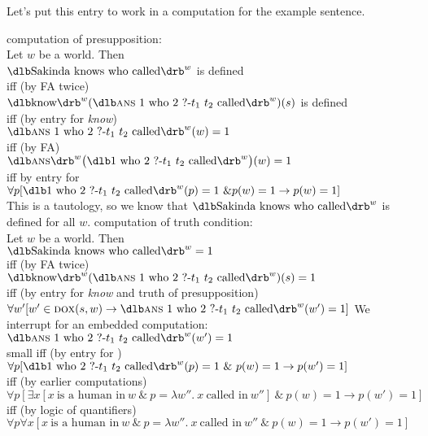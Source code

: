 Let's put this entry to work in a computation for the example sentence.

\pex\label{ex:knows-who-comp}%
\a computation of presupposition:\\
Let $w$ be a world. Then \\
$\svt{Sakinda knows who called}^{w}$ is defined\\
{\small iff (by FA twice)}\\
$\svt{know}^{w}(\svt{\ans 1 who 2 ?-$t_1$ $t_2$ called}^{w})(s)$ is defined\\
{\small iff (by entry for \emph{know})}\\
$\svt{\ans 1 who 2 ?-$t_1$ $t_2$ called}^{w}(w)=1$\\
{\small iff (by FA)}\\
$\svt{\ans}^{w}\big(\svt{1 who 2 ?-$t_1$ $t_2$ called}^{w}\bigr)(w)=1$\\
{\small iff by entry for \ans}\\
$\forall p [ \svt{1 who 2 ?-$t_1$ $t_2$ called}^{w}(p)=1\ \& p(w)=1 \rightarrow p(w)=1 ]$\\
This is a tautology, so we know that $\svt{Sakinda knows who called}^{w}$ is
defined for all $w$.
\a computation of truth condition:\\
Let $w$ be a world. Then\\
$\svt{Sakinda knows who called}^{w} = 1$\\
{\small iff (by FA twice)}\\
$\svt{know}^{w}(\svt{\ans 1 who 2 ?-$t_1$ $t_2$ called}^{w})(s) = 1$\\
{\small iff (by entry for \emph{know} and truth of presupposition)}\\
$\forall w' [w'\in \dox(s,w) \rightarrow \svt{\ans 1 who 2 ?-$t_1$ $t_2$ called}^{w}(w')=1]$
\a We interrupt for an embedded computation:\\
$\svt{\ans 1 who 2 ?-$t_1$ $t_2$ called}^{w}(w')=1$\\
{small iff (by entry for \ans)}\\
$\forall p [ \svt{1 who 2 ?-$t_1$ $t_2$ called}^{w}(p)=1\ \&\ p(w)=1 \rightarrow p(w')=1 ]$\\
{\small iff (by earlier computations)}\\
$\forall p [\exists x [x\ \text{is a human
  in}\ w\ \&\ p=\lambda w''.\ x\ \text{called
  in}\ w'']\ \&\ p(w)=1 \rightarrow p(w')=1 ]$\\
{\small iff (by logic of quantifiers)}\\
$\forall p\forall x [x\ \text{is a human
  in}\ w\ \&\ p=\lambda w''.\ x\ \text{called
  in}\ w''\ \&\ p(w)=1 \rightarrow p(w')=1 ]$\\
